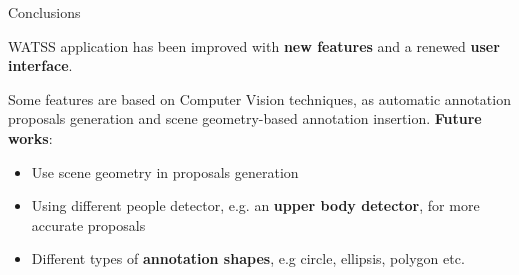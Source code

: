 \documentclass{beamer}
\begin{document}
\begin{tframe}{Conclusions}

WATSS application has been improved with \textbf{new features} and a renewed \textbf{user interface}.
\vspace{0.2cm}

Some features are based on Computer Vision techniques, as automatic annotation proposals generation and scene geometry-based annotation insertion.
\vspace{0.4cm}
\textbf{Future works}:
\vspace{0.2cm}
\begin{itemize}
\item Use scene geometry in proposals generation
\vspace{0.2cm}
\item Using different people detector, e.g. an \textbf{upper body detector}, for more accurate proposals
\vspace{0.2cm}
\item Different types of \textbf{annotation shapes}, e.g circle, ellipsis, polygon etc.
\end{itemize}

\end{tframe}
\end{document}

